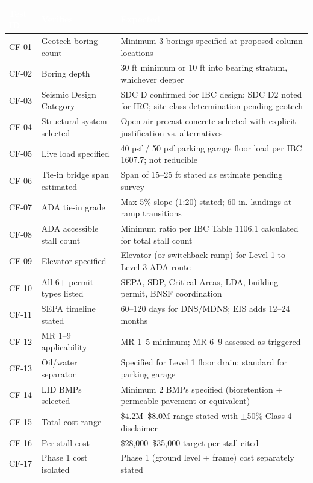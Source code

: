 \documentclass[11pt,letterpaper]{article}
\newcommand{\tableheader}[1]{\textbf{\sffamily\textcolor{white}{#1}}}
\begin{document}
\begin{center}
\begin{tabularx}{\textwidth}{L{1.5cm}L{3.5cm}X}
\toprule
{}
\tableheader{Test ID} & \tableheader{Verifies} & \tableheader{Expected} \\
\midrule
CF-01 & Geotech boring count & Minimum 3 borings specified at proposed column locations \\
CF-02 & Boring depth & 30 ft minimum or 10 ft into bearing stratum, whichever deeper \\
CF-03 & Seismic Design Category & SDC D confirmed for IBC design; SDC D2 noted for IRC; site-class determination pending geotech \\
CF-04 & Structural system selected & Open-air precast concrete selected with explicit justification vs. alternatives \\
CF-05 & Live load specified & 40 psf / 50 psf parking garage floor load per IBC 1607.7; not reducible \\
CF-06 & Tie-in bridge span estimated & Span of 15--25 ft stated as estimate pending survey \\
CF-07 & ADA tie-in grade & Max 5\% slope (1:20) stated; 60-in. landings at ramp transitions \\
CF-08 & ADA accessible stall count & Minimum ratio per IBC Table 1106.1 calculated for total stall count \\
CF-09 & Elevator specified & Elevator (or switchback ramp) for Level 1-to-Level 3 ADA route \\
CF-10 & All 6+ permit types listed & SEPA, SDP, Critical Areas, LDA, building permit, BNSF coordination \\
CF-11 & SEPA timeline stated & 60--120 days for DNS/MDNS; EIS adds 12--24 months \\
CF-12 & MR 1--9 applicability & MR 1--5 minimum; MR 6--9 assessed as triggered \\
CF-13 & Oil/water separator & Specified for Level 1 floor drain; standard for parking garage \\
CF-14 & LID BMPs selected & Minimum 2 BMPs specified (bioretention + permeable pavement or equivalent) \\
CF-15 & Total cost range & \$4.2M--\$8.0M range stated with $\pm$50\% Class 4 disclaimer \\
CF-16 & Per-stall cost & \$28,000--\$35,000 target per stall cited \\
CF-17 & Phase 1 cost isolated & Phase 1 (ground level + frame) cost separately stated \\

\end{tabularx}
\end{center}
\end{document}
